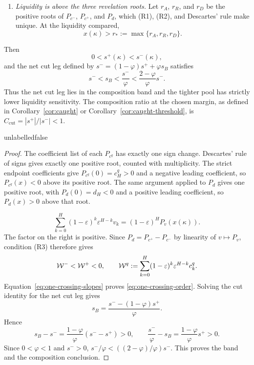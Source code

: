 \begin{lemma}
\begin{enumerate}[label=(R\arabic*),leftmargin=3.0em,itemsep=3pt]
  $(d_0,\ldots,d_H)$ changes sign exactly once, from positive to negative, and
  $d_0>0>d_H$.
\item \emph{Liquidity is above the three revelation roots.} Let $r_A$, $r_R$, and $r_D$ be the
  positive roots of $P_{c^-}$, $P_{c^+}$, and $P_d$, which (R1), (R2), and Descartes' rule make
  unique. At the liquidity compared,
  \[
  x(\kappa)>r_*:=\max\{r_A,r_R,r_D\}.
  \]
\end{enumerate}
Then
\begin{equation}
\label{eq:one-crossing-order}
0<s^+(\kappa)<s^-(\kappa),
\end{equation}
and the net cut leg defined by
$s^-=(1-\varphi)s^++\varphi s_B$ satisfies
\begin{equation}
\label{eq:one-crossing-band}
s^-<s_B<\frac{s^-}{\varphi}
<\frac{2-\varphi}{\varphi}s^-.
\end{equation}
Thus the net cut leg lies in the composition band and the tighter pool has strictly lower liquidity
sensitivity. The composition ratio at the chosen margin, as defined in
Corollary~\ref{cor:caught} or Corollary~\ref{cor:caught-threshold}, is
$C_{\mathrm{cut}}=|s^+|/|s^-|<1$.
\end{lemma}
\csname unlabelledfalse\endcsname

\begin{proof}
The coefficient list of each $P_{c^q}$ has exactly one sign change. Descartes' rule of signs gives
exactly one positive root, counted with multiplicity. The strict endpoint coefficients give
$P_{c^q}(0)=c_H^q>0$ and a negative leading coefficient, so
$P_{c^q}(x)<0$ above its positive root. The same argument applied to $P_d$ gives one positive root,
with $P_d(0)=d_H<0$ and a positive leading coefficient, so $P_d(x)>0$ above that root.

\begin{equation}
\label{eq:one-crossing-factor}
\sum_{k=0}^{H}(1-\varepsilon)^k\varepsilon^{H-k}v_k
=(1-\varepsilon)^H P_v(x(\kappa)).
\end{equation}
The factor on the right is positive. Since $P_d=P_{c^+}-P_{c^-}$ by linearity of $v\mapsto P_v$,
condition (R3) therefore gives
\[
\mathcal{W}^-<\mathcal{W}^+<0,
\qquad
\mathcal{W}^q:=\sum_{k=0}^{H}(1-\varepsilon)^k\varepsilon^{H-k}c_k^q.
\]
Equation~\eqref{eq:one-crossing-slopes} proves
\eqref{eq:one-crossing-order}. Solving the cut identity for the net cut leg gives
\[
s_B=\frac{s^--(1-\varphi)s^+}{\varphi}.
\]
Hence
\[
s_B-s^-=\frac{1-\varphi}{\varphi}(s^--s^+)>0,
\qquad
\frac{s^-}{\varphi}-s_B=\frac{1-\varphi}{\varphi}s^+>0.
\]
Since $0<\varphi<1$ and $s^->0$,
$s^-/\varphi<((2-\varphi)/\varphi)s^-$. This proves the band and the composition conclusion.
\end{proof}

